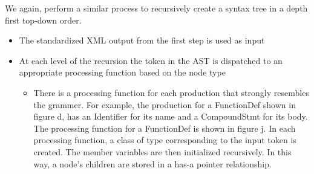 \documentclass[thesis]{hmcposter}
\begin{document}
\begin{poster}
\vspace{0.5in}

We again, perform a similar process to recursively create a syntax tree in a depth first top-down order.
\begin{itemize}
\item The standardized XML output from the first step is used as input
\item At each level of the recursion the token in the AST is dispatched to an appropriate processing function based on the node type
	\begin{itemize}
	\item There is a processing function for each production that strongly resembles the grammer. For example, the production for a FunctionDef shown in figure d, has an Identifier for its name and a CompoundStmt for its body. The processing function for a FunctionDef is shown in figure j. In each processing function, a class of type corresponding to the input token is created. The member variables are then initialized recursively. In this way, a node's children are stored in a has-a pointer relationship. 
	\end{itemize}
\end{itemize}


\vspace{0.5in}

\begin{figure}
\begin{center}
\end{center}
\end{figure}




\end{poster}
\end{document}
